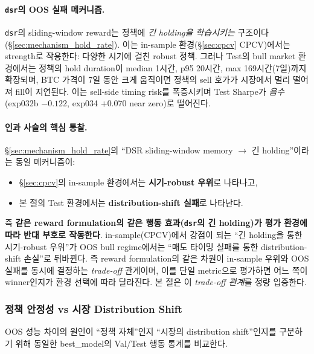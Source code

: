 \documentclass[11pt, a4paper]{article}
\begin{document}
\paragraph{\texttt{dsr}의 OOS 실패 메커니즘.}
\texttt{dsr}의 sliding-window reward는 정책에 \emph{긴 holding을 학습시키는}
구조이다(\S\ref{sec:mechanism_hold_rate}). 이는 in-sample 환경(\S\ref{sec:cpcv}
CPCV)에서는 strength로 작용한다: 다양한 시기에 걸친 robust 정책. 그러나
Test의 bull market 환경에서는 정책의 hold duration이 median 1시간, p95 20시간,
max 169시간(7일)까지 확장되며, BTC 가격이 7일 동안 크게 움직이면 정책의 sell
호가가 시장에서 멀리 떨어져 fill이 지연된다. 이는 sell-side timing risk를
폭증시키며 Test Sharpe가 \emph{음수}(exp032b $-0.122$, exp034 $+0.070$ near
zero)로 떨어진다.

\paragraph{인과 사슬의 핵심 통찰.}
\S\ref{sec:mechanism_hold_rate}의 ``DSR sliding-window memory $\to$ 긴
holding''이라는 동일 메커니즘이:
\begin{itemize}[leftmargin=*]
\item \S\ref{sec:cpcv}의 in-sample 환경에서는 \textbf{시기-robust 우위}로 나타나고,
\item 본 절의 Test 환경에서는 \textbf{distribution-shift 실패}로 나타난다.
\end{itemize}
즉 \textbf{같은 reward formulation의 같은 행동 효과(\texttt{dsr}의 긴 holding)가
평가 환경에 따라 반대 부호로 작동한다}. in-sample(CPCV)에서 강점이 되는
``긴 holding을 통한 시기-robust 우위''가 OOS bull regime에서는 ``매도 타이밍
실패를 통한 distribution-shift 손실''로 뒤바뀐다. 즉 reward formulation의 같은
차원이 in-sample 우위와 OOS 실패를 동시에 결정하는 \emph{trade-off} 관계이며,
이를 단일 metric으로 평가하면 어느 쪽이 winner인지가 환경 선택에 따라 달라진다.
본 절은 이 \emph{trade-off 관계}를 정량 입증한다.

\subsubsection{정책 안정성 vs 시장 Distribution Shift}
\label{sec:oos_policy_stability}

OOS 성능 차이의 원인이 ``정책 자체''인지 ``시장의 distribution shift''인지를
구분하기 위해 동일한 best\_model의 Val/Test 행동 통계를 비교한다.
\end{document}
